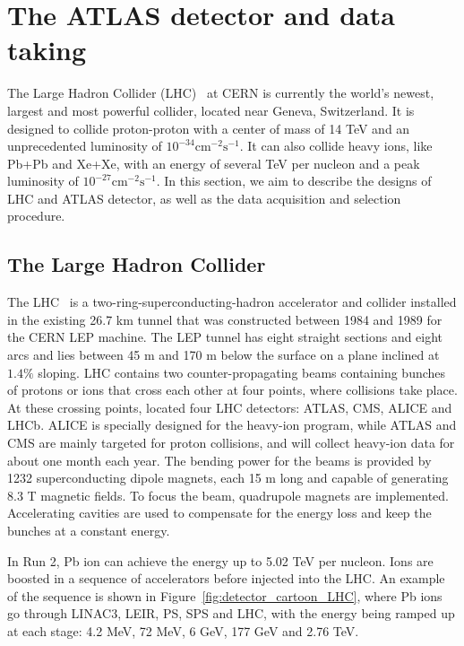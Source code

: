 \section{The ATLAS detector and data taking}
\label{chapter:detector}

The Large Hadron Collider (LHC)~\cite{Evans:2008zzb} at CERN is currently the world's newest, largest and most powerful collider, located near Geneva, Switzerland. It is designed to collide proton-proton with a center of mass of 14 TeV and an unprecedented luminosity of $10^{-34}\text{cm}^{-2}\text{s}^{-1}$. It can also collide heavy ions, like Pb+Pb and Xe+Xe, with an energy of several TeV per nucleon and a peak luminosity of $10^{-27}\text{cm}^{-2}\text{s}^{-1}$. In this section, we aim to describe the designs of LHC and ATLAS detector, as well as the data acquisition and selection procedure.

\subsection{The Large Hadron Collider}

The LHC~\cite{Evans:2008zzb} is a two-ring-superconducting-hadron accelerator and collider installed in the existing 26.7 km tunnel that was constructed between 1984 and 1989 for the CERN LEP machine. The LEP tunnel has eight straight sections and eight arcs and lies between 45 m and 170 m below the surface on a plane inclined at $1.4\%$ sloping. LHC contains two counter-propagating beams containing bunches of protons or ions that cross each other at four points, where collisions take place. At these crossing points, located four LHC detectors: ATLAS, CMS, ALICE and LHCb. ALICE is specially designed for the heavy-ion program, while ATLAS and CMS are mainly targeted for proton collisions, and will collect heavy-ion data for about one month each year. The bending power for the beams is provided by 1232 superconducting dipole magnets, each 15 m long and capable of generating 8.3 T magnetic fields. To focus the beam, quadrupole magnets are implemented. Accelerating cavities are used to compensate for the energy loss and keep the bunches at a constant energy.

In Run 2, Pb ion can achieve the energy up to 5.02 TeV per nucleon. Ions are boosted in a sequence of accelerators before injected into the LHC. An example of the sequence is shown in Figure~\ref{fig:detector_cartoon_LHC}, where Pb ions go through LINAC3, LEIR, PS, SPS and LHC, with the energy being ramped up at each stage: 4.2 MeV, 72 MeV, 6 GeV, 177 GeV and 2.76 TeV.

